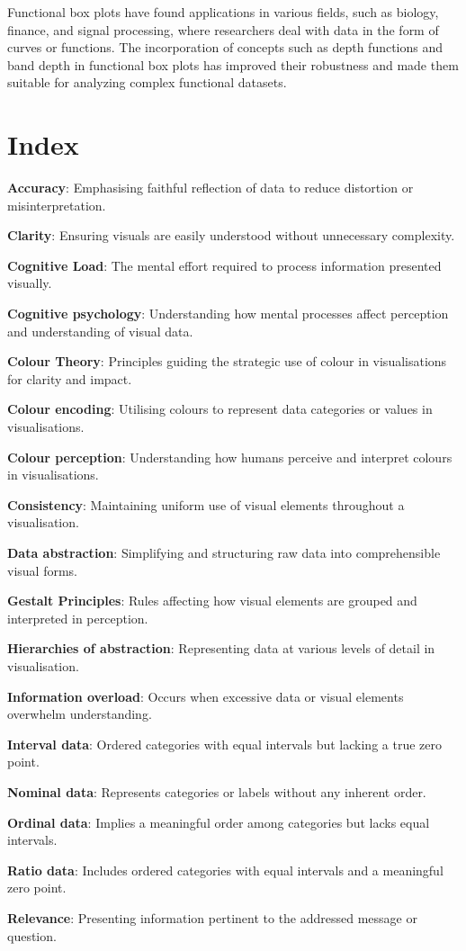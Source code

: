 \documentclass{article}\usepackage[]{graphicx}\usepackage[]{xcolor}
\numberwithin{equation}{section}
\begin{document}
{\noindent Functional box plots have found applications in various fields, such as biology, finance, and signal processing, where researchers deal with data in the form of curves or functions. The incorporation of concepts such as depth functions and band depth in functional box plots has improved their robustness and made them suitable for analyzing complex functional datasets.


\newpage  

\section{Index}  

\begin{itemise}
    \item \textbf{Accuracy}: Emphasising faithful reflection of data to reduce distortion or misinterpretation.
    \item \textbf{Clarity}: Ensuring visuals are easily understood without unnecessary complexity.
    \item \textbf{Cognitive Load}: The mental effort required to process information presented visually.
    \item \textbf{Cognitive psychology}: Understanding how mental processes affect perception and understanding of visual data.
    \item \textbf{Colour Theory}: Principles guiding the strategic use of colour in visualisations for clarity and impact.
    \item \textbf{Colour encoding}: Utilising colours to represent data categories or values in visualisations.
    \item \textbf{Colour perception}: Understanding how humans perceive and interpret colours in visualisations.
    \item \textbf{Consistency}: Maintaining uniform use of visual elements throughout a visualisation.
    \item \textbf{Data abstraction}: Simplifying and structuring raw data into comprehensible visual forms.
    \item \textbf{Gestalt Principles}: Rules affecting how visual elements are grouped and interpreted in perception.
    \item \textbf{Hierarchies of abstraction}: Representing data at various levels of detail in visualisation.
    \item \textbf{Information overload}: Occurs when excessive data or visual elements overwhelm understanding.
    \item \textbf{Interval data}: Ordered categories with equal intervals but lacking a true zero point.
    \item \textbf{Nominal data}: Represents categories or labels without any inherent order.
    \item \textbf{Ordinal data}: Implies a meaningful order among categories but lacks equal intervals.
    \item \textbf{Ratio data}: Includes ordered categories with equal intervals and a meaningful zero point.
    \item \textbf{Relevance}: Presenting information pertinent to the addressed message or question.
\end{itemise}
  
}
\end{document}
